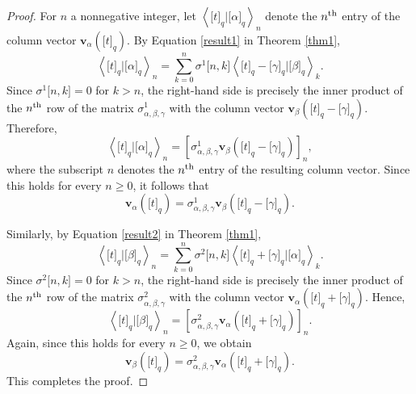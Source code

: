\documentclass[12pt]{article}
\def\v{\mathbf{v}}
\begin{document}
\begin{proof}
	For $n$ a nonnegative integer, let
	$\left\langle \big[t\big]_q|\big[\alpha\big]_q\right\rangle_n$
	denote the $n^{\rm th}$ entry of the column vector
	$\v_{\alpha}\left(\big[t\big]_q\right)$.
	By Equation \eqref{result1} in Theorem \ref{thm1},
	\begin{equation*}
		\left\langle \big[t\big]_q|\big[\alpha\big]_q\right\rangle_n=\sum_{k=0}^{n}\sigma^1\big[n,k\big]\left\langle\big[t\big]_q-\big[\gamma\big]_q\big|\big[\beta\big]_q\right\rangle_k.
	\end{equation*}
	Since $\sigma^1\big[n,k\big]=0$ for $k>n$, the right-hand side is precisely the inner product of the $n^{\rm th}$ row of the matrix $\sigma^1_{\alpha,\beta,\gamma}$ with the column vector
	$\v_{\beta}\left(\big[t\big]_q-\big[\gamma\big]_q\right)$.
	Therefore,
	\begin{equation*}
		\left\langle \big[t\big]_q|\big[\alpha\big]_q\right\rangle_n=\left[\sigma^1_{\alpha,\beta,\gamma}\v_{\beta}\left(\big[t\big]_q-\big[\gamma\big]_q\right)\right]_n,
	\end{equation*}
	where the subscript $n$ denotes the $n^{\rm th}$ entry of the resulting column vector.
	Since this holds for every $n\geq0$, it follows that
	\begin{equation}
		\v_{\alpha}\left(\big[t\big]_q\right)=\sigma^1_{\alpha,\beta,\gamma}\v_{\beta}\left(\big[t\big]_q-\big[\gamma\big]_q\right).
	\end{equation}
	
	Similarly, by Equation \eqref{result2} in Theorem \ref{thm1},
	\begin{equation*}
		\left\langle \big[t\big]_q|\big[\beta\big]_q\right\rangle_n=\sum_{k=0}^{n}
		\sigma^2\big[n,k\big]\left\langle\big[t\big]_q+\big[\gamma\big]_q\big|\big[\alpha\big]_q\right\rangle_k.
	\end{equation*}
	Since $\sigma^2\big[n,k\big]=0$ for $k>n$, the right-hand side is precisely the inner product of the $n^{\rm th}$ row of the matrix $\sigma^2_{\alpha,\beta,\gamma}$ with the column vector
	$\v_{\alpha}\left(\big[t\big]_q+\big[\gamma\big]_q\right)$.
	Hence,
	\begin{equation*}
		\left\langle \big[t\big]_q|\big[\beta\big]_q\right\rangle_n=\left[\sigma^2_{\alpha,\beta,\gamma}\v_{\alpha}\left(\big[t\big]_q+\big[\gamma\big]_q\right)\right]_n.
	\end{equation*}
	Again, since this holds for every $n\geq0$, we obtain
	\begin{equation}
		\v_{\beta}\left(\big[t\big]_q\right)=\sigma^2_{\alpha,\beta,\gamma}\v_{\alpha}\left(\big[t\big]_q+\big[\gamma\big]_q\right).
	\end{equation}
	This completes the proof.
\end{proof}
\end{document}
